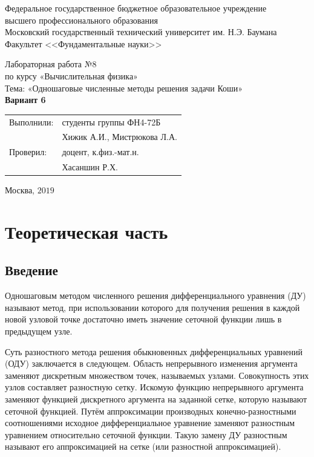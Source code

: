 \documentclass[
11pt,
master, %
subf, %
href, %
colorlinks=true, %
times, %
]{disser}
\begin{document}
\pagestyle{empty}
\begin{center}

\noindent  Федеральное государственное бюджетное образовательное учреждение\\
высшего профессионального образования\\

Московский государственный технический университет им. Н.Э. Баумана \\
Факультет <<Фундаментальные науки>>\bigskip\\

\vfill

Лабораторная работа №8\\
по курсу «Вычислительная физика»\\
Тема: «Одношаговые численные методы решения задачи Коши»\\
\textbf{Вариант 6}\\


\vfill
\vfill
\begin{flushright}
\begin{tabular}{ll}
Выполнили: & студенты группы ФН4-72Б     \\
           & Хижик А.И., Мистрюкова Л.А.  \\
Проверил:  & доцент, к.физ.-мат.н.       \\
           & Хасаншин Р.Х.
\end{tabular}
\end{flushright}
\vfill
\begin{center}
Москва, $2019$
\end{center}

\end{center}
\pagebreak


\pagestyle{plain}
\tableofcontents

\section{Теоретическая часть}
\subsection{Введение}
Одношаговым методом численного решения дифференциального уравнения (ДУ) называют метод, при использовании которого для получения решения в каждой новой узловой точке достаточно иметь значение сеточной функции лишь в предыдущем узле.

Суть разностного метода решения обыкновенных дифференциальных уравнений (ОДУ) заключается в следующем. Область непрерывного изменения аргумента заменяют дискретным множеством точек, называемых узлами. Совокупность этих узлов составляет разностную сетку. Искомую функцию непрерывного аргумента заменяют функцией дискретного аргумента на заданной сетке, которую называют сеточной функцией. Путём аппроксимации производных конечно-разностными соотношениями исходное дифференциальное уравнение заменяют разностным уравнением относительно сеточной функции. Такую замену ДУ разностным называют его аппроксимацией на сетке (или разностной аппроксимацией).
\end{document}
